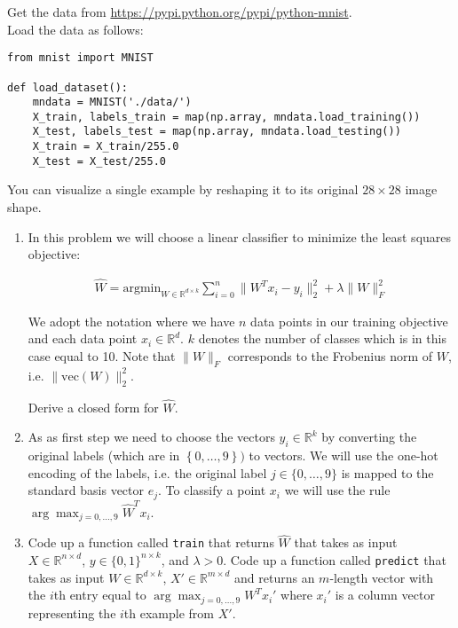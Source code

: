 \documentclass{article}
\newcommand{\1}{\mathbf{1}}
\def\R{\mathbb{R}}
\begin{document}
Get the data from \url{https://pypi.python.org/pypi/python-mnist}. \\
Load the data as follows:
\begin{verbatim}
from mnist import MNIST

def load_dataset():
    mndata = MNIST('./data/')
    X_train, labels_train = map(np.array, mndata.load_training())
    X_test, labels_test = map(np.array, mndata.load_testing())
    X_train = X_train/255.0
    X_test = X_test/255.0
\end{verbatim}
You can visualize a single example by reshaping it to its original $28 \times 28$ image shape.

\begin{enumerate}
\item In this problem we will choose a linear classifier to minimize the least squares objective:

\begin{align*}\widehat{W} = \text{argmin}_{W \in \R^{d \times k}} \sum_{i=0}^{n} \| W^Tx_{i} - y_{i} \|^{2}_{2} + \lambda \|W\|_{F}^{2}
\end{align*}

We adopt the notation where we have $n$ data points in our training objective 
and each data point $x_i \in \R^d$. $k$ denotes
the number of classes which is in this case equal to 10. Note that $\|W\|_{F}$ corresponds to the Frobenius norm of $W$, i.e. $\|\text{vec}(W)\|_2^2$.

Derive a closed form for $\widehat{W}$.

\item
As as first step we need to choose the vectors $y_i \in \mathbb{R}^k$ by converting the original labels (which are in $\left\{0,\ldots,9\right\})$ to
vectors.
We will use the one-hot encoding of the labels, i.e. the original label $j \in \{0, \ldots, 9\}$ is mapped to the standard basis vector $e_j$.
To classify a point $x_i$ we will use the rule $\arg\max_{j=0,\dots,9} \widehat{W}^T x_i$.

\item
Code up a function called \verb|train| that returns $\widehat{W}$ that takes as input $X \in\R^{n \times d}$, $y \in \{0,1\}^{n \times k}$, and $\lambda > 0$.
Code up a function called \verb|predict| that takes as input $W \in \R^{d \times k}$, $X' \in\R^{m \times d}$ and returns an $m$-length vector with the $i$th entry equal to $\arg\max_{j=0,\dots,9} W^T x_i'$ where $x_i'$ is a column vector representing the $i$th example from $X'$.\\


\end{enumerate}
\end{document}
